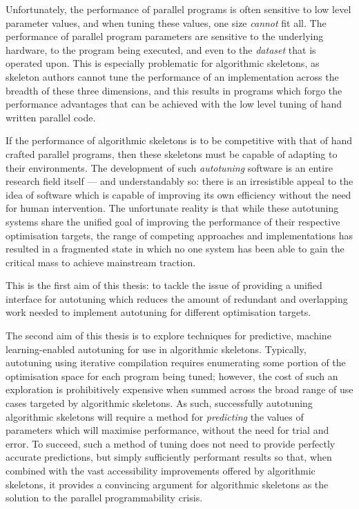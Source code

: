 \documentclass[prodmode,acmtecs]{acmsmall} %
\begin{document}
Unfortunately, the performance of parallel programs is often sensitive
to low level parameter values, and when tuning these values, one size
\emph{cannot} fit all. The performance of parallel program parameters
are sensitive to the underlying hardware, to the program being
executed, and even to the \emph{dataset} that is operated upon. This
is especially problematic for algorithmic skeletons, as skeleton
authors cannot tune the performance of an implementation across the
breadth of these three dimensions, and this results in programs which
forgo the performance advantages that can be achieved with the low
level tuning of hand written parallel code.



If the performance of algorithmic skeletons is to be competitive with
that of hand crafted parallel programs, then these skeletons must be
capable of adapting to their environments. The development of such
\emph{autotuning} software is an entire research field itself --- and
understandably so: there is an irresistible appeal to the idea of
software which is capable of improving its own efficiency without the
need for human intervention. The unfortunate reality is that while
these autotuning systems share the unified goal of improving the
performance of their respective optimisation targets, the range of
competing approaches and implementations has resulted in a fragmented
state in which no one system has been able to gain the critical mass
to achieve mainstream traction.

This is the first aim of this thesis: to tackle the issue of providing
a unified interface for autotuning which reduces the amount of
redundant and overlapping work needed to implement autotuning for
different optimisation targets.


The second aim of this thesis is to explore techniques for predictive,
machine learning-enabled autotuning for use in algorithmic
skeletons. Typically, autotuning using iterative compilation requires
enumerating some portion of the optimisation space for each program
being tuned; however, the cost of such an exploration is prohibitively
expensive when summed across the broad range of use cases targeted by
algorithmic skeletons. As such, successfully autotuning algorithmic
skeletons will require a method for \emph{predicting} the values of
parameters which will maximise performance, without the need for trial
and error. To succeed, such a method of tuning does not need to
provide perfectly accurate predictions, but simply sufficiently
performant results so that, when combined with the vast accessibility
improvements offered by algorithmic skeletons, it provides a
convincing argument for algorithmic skeletons as the solution to the
parallel programmability crisis.
\end{document}

